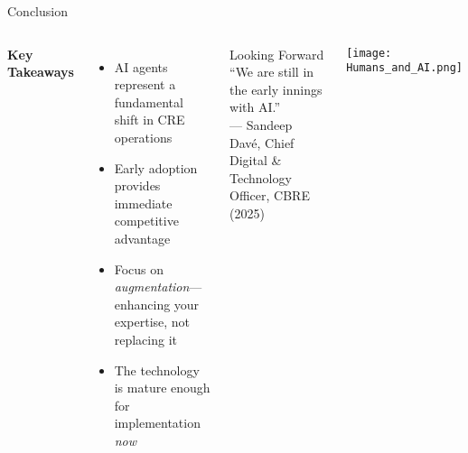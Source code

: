 \documentclass{beamer}
\begin{document}
\begin{frame}{Conclusion}
  \begin{columns}[t,onlytextwidth]
  \small
      \vspace{0.5em}   %
      \textbf{Key Takeaways}
      \begin{itemize}
        \item AI agents represent a fundamental shift in CRE operations
        \item Early adoption provides immediate competitive advantage
        \item Focus on \emph{augmentation}—enhancing your expertise, not replacing it
        \item The technology is mature enough for implementation \emph{now}
      \end{itemize}

      \vspace{0.7em}
      \begin{block}{Looking Forward}
        {\small
        “We are still in the early innings with AI.”\\
        {\tiny — Sandeep Davé, Chief Digital \& Technology Officer, CBRE (2025)}
        }
      \end{block}

      \vspace{1em}
      \centering
      \texttt{[image: Humans\_and\_AI.png]}
  \end{columns}
\end{frame}





    
\end{document}
